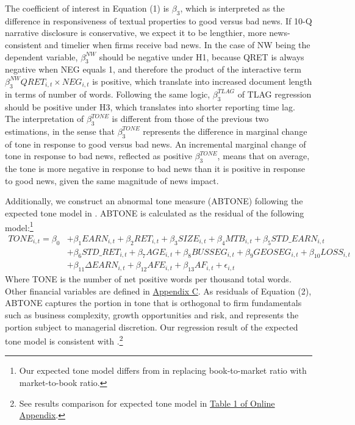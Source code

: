 \documentclass[a4paper]{article}
\begin{document}
\begin{spacing}{2}
The coefficient of interest in Equation (1) is $\beta_3$, which is interpreted as the difference in responsiveness of textual properties to good versus bad news. If 10-Q narrative disclosure is conservative, we expect it to be lengthier, more news-consistent and timelier when firms receive bad news. In the case of NW being the dependent variable, $\beta_3^{NW}$ should be negative under H1, because QRET is always negative when NEG equals 1, and therefore the product of the interactive term $\beta_3^{NW}QRET_{i,t}\times NEG_{i,t}$ is positive, which translate into increased document length in terms of number of words. Following the same logic, $\beta_3^{TLAG}$ of TLAG regression should be positive under H3, which translates into shorter reporting time lag. The interpretation of $\beta_3^{TONE}$ is different from those of the previous two estimations, in the sense that $\beta_3^{TONE}$ represents the difference in marginal change of tone in response to good versus bad news. An incremental marginal change of tone in response to bad news, reflected as positive $\beta_3^{TONE}$, means that on average, the tone is more negative in response to bad news than it is positive in response to good news, given the same magnitude of news impact.

Additionally, we construct an abnormal tone measure (ABTONE) following the expected tone model in . ABTONE is calculated as the residual of the following model:\footnote{Our expected tone model differs from  in replacing book-to-market ratio with market-to-book ratio.}
\begin{equation} \label{eq2}
\begin{split}
TONE_{i,t}=\beta_0&+\beta_1EARN_{i,t}+\beta_2RET_{i,t}+\beta_3SIZE_{i,t}+\beta_4MTB_{i,t}+\beta_5STD\_EARN_{i,t}\\
&+\beta_6STD\_RET_{i,t}+\beta_7AGE_{i,t}+\beta_8BUSSEG_{i,t}+\beta_9GEOSEG_{i,t}+\beta_{10}LOSS_{i,t}\\
&+\beta_{11}\Delta EARN_{i,t}+\beta_{12}AFE_{i,t}+\beta_{13}AF_{i,t}+\epsilon_{i,t}
\end{split}
\end{equation}
Where TONE is the number of net positive words per thousand total words. Other financial variables are defined in \hyperref[appc]{Appendix C}. As residuals of Equation (2), ABTONE captures the portion in tone that is orthogonal to firm fundamentals such as business complexity, growth opportunities and risk, and represents the portion subject to managerial discretion. Our regression result of the expected tone model is consistent with .\footnote{See results comparison for expected tone model in \hyperref[oat1]{Table 1 of Online Appendix}.}


\end{spacing}
\end{document}
